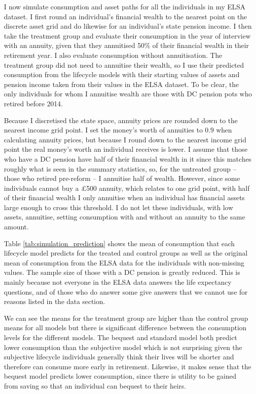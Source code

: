 \documentclass[12pt]{article}
\begin{document}
I now simulate consumption and asset paths for all the individuals in my ELSA
dataset. I first round an individual's financial wealth to the nearest point on the
discrete asset grid and do likewise for an individual's state pension income. I
then take the treatment group and evaluate their consumption in the year of
interview with an annuity, given that they annuitised 50\% of their financial
wealth in their retirement year. I also evaluate consumption without
annuitisation. The treatment group did not need to annuitise their wealth, so I
use their predicted consumption from the lifecycle models with their starting
values of assets and pension income taken from their values in the ELSA dataset.
To be clear, the only individuals for whom I annuitise wealth are those with DC
pension pots who retired before 2014.

Because I discretised the state space, annuity prices are rounded down to the
nearest income grid point. I set the money's worth of annuities to $0.9$ when
calculating annuity prices, but because I round down to the nearest income grid
point the real money's worth an individual receives is lower. I assume that
those who have a DC pension have half of their financial wealth in it since this
matches roughly what is seen in the summary statistics, so, for the untreated
group -- those who retired pre-reform -- I annuitise half of wealth. However,
since some individuals cannot buy a £500 annuity, which relates to one grid
point, with half of their financial wealth I only annuitise when an individual
has financial assets large enough to cross this threshold. I do not let these
individuals, with low assets, annuitise, setting consumption with and without an
annuity to the same amount.




Table \ref{tab:simulation_prediction} shows the mean of consumption that each
lifecycle model predicts for the treated and control groups as well as the
original mean of consumption from the ELSA data for the individuals with
non-missing values. The sample size of those with a DC pension is greatly
reduced. This is mainly because not everyone in the ELSA data answers the life
expectancy questions, and of those who do answer some give answers that we cannot
use for reasons listed in the data section.

We can see the means for the treatment group are higher than the control group
means for all models but there is significant difference between the consumption
levels for the different models. The bequest and standard model both predict
lower consumption than the subjective model which is not surprising given the
subjective lifecycle individuals generally think their lives will be shorter and
therefore can consume more early in retirement. Likewise, it makes sense that
the bequest model predicts lower consumption, since there is utility to be
gained from saving so that an individual can bequest to their heirs.
\end{document}
